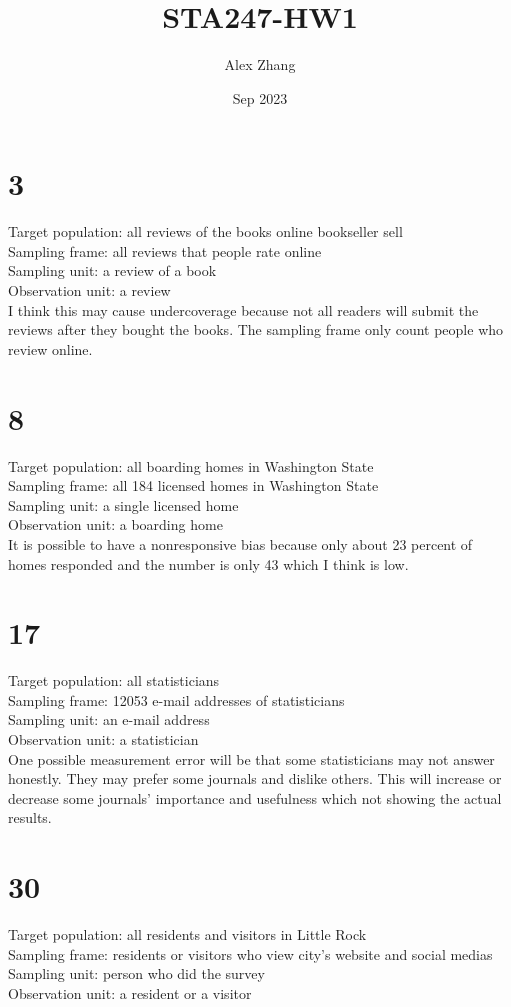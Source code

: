 \documentclass{article}
\title{STA247-HW1}
\author{Alex Zhang}
\date{Sep 2023}
\begin{document}
\maketitle
\section*{3}
Target population: all reviews of the books online bookseller sell\\
Sampling frame: all reviews that people rate online\\
Sampling unit: a review of a book\\
Observation unit: a review\\

I think this may cause undercoverage because not all readers will submit the reviews after they bought the books.
The sampling frame only count people who review online.
\section*{8}
Target population: all boarding homes in Washington State\\
Sampling frame: all 184 licensed homes in Washington State\\
Sampling unit: a single licensed home\\
Observation unit: a boarding home\\

It is possible to have a nonresponsive bias because only about 23 percent of homes responded and the number is only 43 which I think is low.



\section*{17}
Target population: all statisticians\\
Sampling frame: 12053 e-mail addresses of statisticians\\
Sampling unit: an e-mail address\\
Observation unit: a statistician\\

One possible measurement error will be that some statisticians may not answer honestly. 
They may prefer some journals and dislike others.
This will increase or decrease some journals' importance and usefulness which not showing the actual results.



\section*{30}
Target population: all residents and visitors in Little Rock\\
Sampling frame: residents or visitors who view city's website and social medias \\
Sampling unit: person who did the survey\\
Observation unit: a resident or a visitor\\
\end{document}
